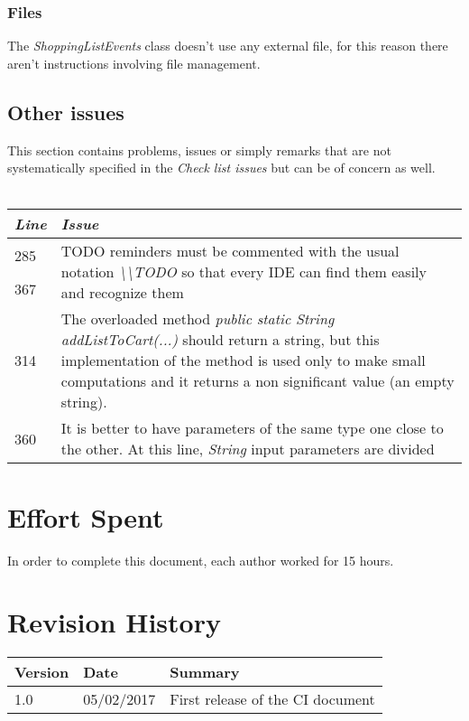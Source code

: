 \documentclass[11pt,a4paper]{report}
\begin{document}
\subsection{Files}
The \textit{ShoppingListEvents} class doesn't use any external file, for this reason there aren't instructions involving file management.
\section{Other issues}
This section contains problems, issues or simply remarks that are not systematically specified in the \textit{Check list issues} but can be of concern as well.\\\\
\begin{tabularx}{\textwidth}{|l|X|}
	\hline
	\textit{Line} & \textit{Issue}\\
	\hline
	\hline
	285 & \multirow{2}{\linewidth}{TODO reminders must be commented with the usual notation \textit{\textbackslash\textbackslash TODO} so that every IDE can find them easily and recognize them}\\
	367 & \\
	\hline
	314 & The overloaded method \textit{public static String addListToCart(...)} should return a string, but this implementation of the method is used only to make small computations and it returns a non significant value (an empty string).\\
	\hline
	360 & It is better to have parameters of the same type one close to the other. At this line, \textit{String} input parameters are divided\\
	\hline
\end{tabularx}
\chapter{Effort Spent}
In order to complete this document, each author worked for 15 hours.
\chapter{Revision History}
\begin{tabularx}{\textwidth}{|l|l|X|}
	\hline
	Version & Date & Summary\\
	\hline
	\hline
	1.0 & 05/02/2017 & First release of the CI document\\
	\hline
\end{tabularx}
\end{document}

